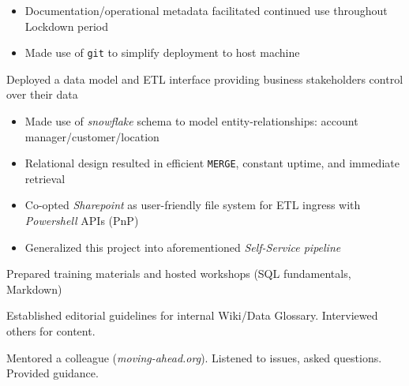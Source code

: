 \documentclass[../cv.tex]{subfiles}
\begin{document}
\begin{description}[style=multiline, leftmargin=3.5cm]
\begin{itemize}
		     \item Documentation/operational metadata facilitated continued use throughout Lockdown period
		     \item Made use of \texttt{git} to simplify deployment to host machine
	      \end{itemize}
	\item[Sales Data Model\\ \textnormal{PL/SQL\\Powershell}]
		Deployed a data model and ETL interface providing business stakeholders control over their data
		  \begin{itemize}		     
			\item Made use of \textit{snowflake} schema to model entity-relationships: account manager/customer/location 
		    \item Relational design resulted in efficient \texttt{MERGE}, constant uptime, and immediate retrieval
		    \item Co-opted \textit{Sharepoint} as user-friendly file system for ETL ingress with \textit{Powershell} APIs (PnP)
		    \item Generalized this project into aforementioned \textit{Self-Service pipeline}
	      \end{itemize}
	\item[Training] Prepared training materials and hosted workshops (SQL fundamentals, Markdown)
	\item[Data Glossary] Established editorial guidelines for internal Wiki/Data Glossary. Interviewed others for content.
	\item[Mentorship] Mentored a colleague (\textit{moving-ahead.org}). Listened to issues, asked questions. Provided guidance.
\end{description}
\end{document}
